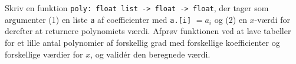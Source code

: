 Skriv en funktion \lstinline{poly: float list -> float -> float}, der tager som argumenter (1) en liste \lstinline{a} af coefficienter med \lstinline{a.[i]} $= a_i$ og (2) en $x$-værdi for derefter at returnere polynomiets værdi. Afprøv funktionen ved at lave tabeller for et lille antal polynomier af forskellig grad med forskellige koefficienter og forskellige værdier for $x$, og valid\'{e}r den beregnede værdi.
